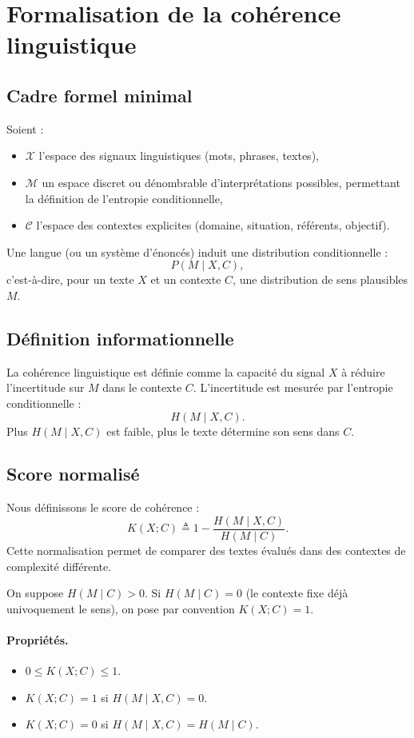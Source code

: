 \documentclass[11pt,a4paper]{article}
\begin{document}
\section{Formalisation de la cohérence linguistique}
\subsection{Cadre formel minimal}
Soient :
\begin{itemize}
\item $\mathcal{X}$ l’espace des signaux linguistiques (mots, phrases, textes),
\item $\mathcal{M}$ un espace discret ou dénombrable d’interprétations possibles, permettant la définition de l’entropie conditionnelle,
\item $\mathcal{C}$ l’espace des contextes explicites (domaine, situation, référents, objectif).
\end{itemize}

Une langue (ou un système d’énoncés) induit une distribution conditionnelle :
\[
P(M\mid X,C),
\]
c’est-à-dire, pour un texte $X$ et un contexte $C$, une distribution de sens plausibles $M$.

\subsection{Définition informationnelle}
La cohérence linguistique est définie comme la capacité du signal $X$ à réduire l’incertitude sur $M$ dans le contexte $C$.
L’incertitude est mesurée par l’entropie conditionnelle :
\[
H(M\mid X,C).
\]
Plus $H(M\mid X,C)$ est faible, plus le texte détermine son sens dans $C$.

\subsection{Score normalisé}
Nous définissons le score de cohérence :
\[
K(X;C) \triangleq 1 - \frac{H(M\mid X,C)}{H(M\mid C)}.
\]
Cette normalisation permet de comparer des textes évalués dans des contextes de complexité différente.

On suppose $H(M\mid C)>0$. Si $H(M\mid C)=0$ (le contexte fixe déjà univoquement le sens), on pose par convention $K(X;C)=1$.

\paragraph{Propriétés.}
\begin{itemize}
\item $0\le K(X;C)\le 1$.
\item $K(X;C)=1$ si $H(M\mid X,C)=0$.
\item $K(X;C)=0$ si $H(M\mid X,C)=H(M\mid C)$.
\end{itemize}
\end{document}
